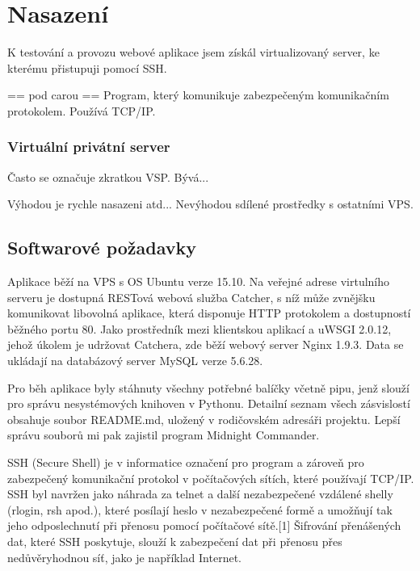 \chapter{Nasazení}

K testování a provozu webové aplikace jsem získál virtualizovaný server, ke kterému přistupuji pomocí SSH.

== pod carou ==
Program, který komunikuje zabezpečeným komunikačním protokolem. Používá TCP/IP.

\subsection{Virtuální privátní server}

Často se označuje zkratkou VSP. Bývá...

Výhodou je rychle nasazeni atd...
Nevýhodou sdílené prostředky s ostatními VPS.


\section{Softwarové požadavky}

Aplikace běží na VPS s OS Ubuntu verze 15.10. Na veřejné adrese virtulního serveru
je dostupná RESTová webová služba Catcher, s níž může zvnějšku komunikovat libovolná aplikace,
která disponuje HTTP protokolem a dostupností běžného portu 80. Jako prostředník mezi klientskou aplikací
a uWSGI 2.0.12, jehož úkolem je udržovat Catchera, zde běží webový server Nginx 1.9.3.
Data se ukládají na databázový server MySQL verze 5.6.28.

Pro běh aplikace byly stáhnuty všechny potřebné balíčky včetně pipu, jenž slouží pro správu nesystémových knihoven v Pythonu. Detailní seznam všech zásvislostí obsahuje soubor README.md, uložený v rodičovském adresáři projektu. Lepší správu souborů mi pak zajistil program Midnight Commander.


SSH (Secure Shell) je v informatice označení pro program a zároveň pro zabezpečený komunikační protokol v počítačových sítích, které používají TCP/IP. SSH byl navržen jako náhrada za telnet a další nezabezpečené vzdálené shelly (rlogin, rsh apod.), které posílají heslo v nezabezpečené formě a umožňují tak jeho odposlechnutí při přenosu pomocí počítačové sítě.[1] Šifrování přenášených dat, které SSH poskytuje, slouží k zabezpečení dat při přenosu přes nedůvěryhodnou síť, jako je například Internet.


